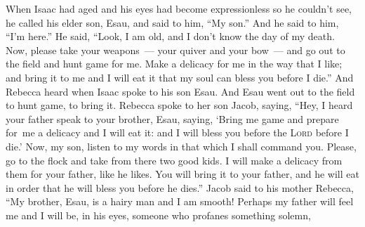 
\begin{inparaenum}
   When Isaac had aged and his eyes had become expressionless so he couldn't see, he called his elder son, Esau, and said to him, ``My son.'' And he said to him, ``I'm here.''%
   He said, ``Look, I am old, and I don't know the day of my death.%
   Now, please take your weapons~--- your quiver and your bow~--- and go out to the field and hunt game for me.%
   Make a delicacy%
  for me in the way that%
  I like; and bring it to me and I will eat it that my soul can bless you before I die.''%
   And Rebecca heard when Isaac spoke to his son Esau. And Esau went out to the field to hunt game, to bring it.%
   Rebecca spoke to her son Jacob, saying, ``Hey, I heard your father speak to your brother, Esau, saying,%
   `Bring me game and prepare for\understood\ me a delicacy and I will eat it: and I will bless you before the \textsc{Lord} before I die.'%
   Now, my son, listen to my words in that which I shall command you.%
   Please, go to the flock and take from there two good kids. I will make a delicacy from them for your father, like he likes.%
   You will bring it to your father, and he will eat in order that he will bless you before he dies.''%
   Jacob said to his mother Rebecca, ``My brother, Esau, is a hairy man and I am smooth!%
   Perhaps my father will feel me and I will be, in his eyes, someone who profanes something solemn,%

\end{inparaenum}
